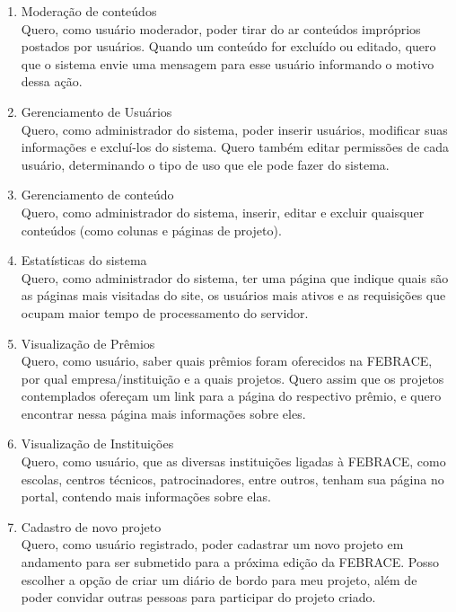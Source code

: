 \begin{enumerate}
    \item Moderação de conteúdos \\
      Quero, como usuário moderador, poder tirar do ar conteúdos impróprios postados por usuários. Quando um conteúdo for excluído ou editado, quero que o sistema envie uma mensagem para esse usuário informando o motivo dessa ação.
    \item Gerenciamento de Usuários \\
      Quero, como administrador do sistema, poder inserir usuários, modificar suas informações e excluí-los do sistema. Quero também editar permissões de cada usuário, determinando o tipo de uso que ele pode fazer do sistema.
    \item Gerenciamento de conteúdo \\
      Quero, como administrador do sistema, inserir, editar e excluir quaisquer conteúdos (como colunas e páginas de projeto).
    \item Estatísticas do sistema \\
      Quero, como administrador do sistema, ter uma página que indique quais são as páginas mais visitadas do site, os usuários mais ativos e as requisições que ocupam maior tempo de processamento do servidor.
    \item Visualização de Prêmios \\
      Quero, como usuário, saber quais prêmios foram oferecidos na FEBRACE, por qual empresa/instituição e a quais projetos. Quero assim que os projetos contemplados ofereçam um link para a página do respectivo prêmio, e quero encontrar nessa página mais informações sobre eles.
    \item Visualização de Instituições \\
      Quero, como usuário, que as diversas instituições ligadas à FEBRACE, como escolas, centros técnicos, patrocinadores, entre outros, tenham sua página no portal, contendo mais informações sobre elas.
    \item Cadastro de novo projeto \\
      Quero, como usuário registrado, poder cadastrar um novo projeto em andamento para ser submetido para a próxima edição da FEBRACE. Posso escolher a opção de criar um diário de bordo para meu projeto, além de poder convidar outras pessoas para participar do projeto criado.
	\end{enumerate}

